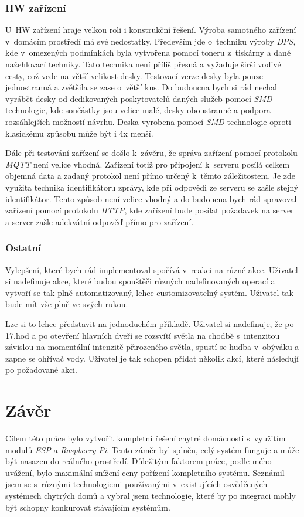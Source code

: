 \subsection*{HW zařízení}
\label{testovani:navrh:hw}
U~HW zařízení hraje velkou roli i konstrukční řešení.
Výroba samotného zařízení v~domácím prostředí má své nedostatky.
Především jde o~techniku výroby \emph{DPS}, kde v~omezených podmínkách byla vytvořena pomocí toneru z~tiskárny a dané nažehlovací techniky.
Tato technika není příliš přesná a vyžaduje širší vodivé cesty, což vede na větší velikost desky.
Testovací verze desky byla pouze jednostranná a zvětšila se zase o~větší kus.
Do budoucna bych si rád nechal vyrábět desky od dedikovaných poskytovatelů daných služeb pomocí \emph{SMD} technologie, kde součástky jsou velice malé, desky oboustranné a podpora rozsáhlejších možností návrhu.
Deska vyrobena pomocí \emph{SMD} technologie oproti klasickému způsobu může být i 4x menší.

Dále při testování zařízení se došlo k~závěru, že správa zařízení pomocí protokolu \emph{MQTT} není velice vhodná.
Zařízení totiž pro připojení k~serveru posílá celkem objemná data a zadaný protokol není přímo určený k~těmto záležitostem.
Je zde využita technika identifikátoru zprávy, kde při odpovědi ze serveru se zašle stejný identifikátor.
Tento způsob není velice vhodný a do budoucna bych rád spravoval zařízení pomocí protokolu \emph{HTTP}, kde zařízení bude posílat požadavek na server a server zašle adekvátní odpověď přímo pro zařízení.

\subsection*{Ostatní}
\label{testovani:navrh:ostatní}
Vylepšení, které bych rád implementoval spočívá v~reakci na různé akce.
Uživatel si nadefinuje akce, které budou spouštěči různých nadefinovaných operací a vytvoří se tak plně automatizovaný, lehce customizovatelný systém.
Uživatel tak bude mít vše plně ve svých rukou.

Lze si to lehce představit na jednoduchém příkladě.
Uživatel si nadefinuje, že po 17.hod a po otevření hlavních dveří se rozsvítí světla na chodbě s~intenzitou závislou na momentální intenzitě přirozeného světla, spustí se hudba v~obýváku a zapne se ohřívač vody.
Uživatel je tak schopen přidat několik akcí, které následují po požadované akci.

\chapter{Závěr}
\label{zaver}
Cílem této práce bylo vytvořit kompletní řešení chytré domácnosti s~využitím modulů \emph{ESP} a \emph{Raspberry Pi}.
Tento záměr byl splněn, celý systém funguje a může být nasazen do reálného prostředí.
Důležitým faktorem práce, podle mého uvážení, bylo maximální snížení ceny pořízení kompletního systému.
Seznámil jsem se s~různými technologiemi používanými v~existujících osvědčených systémech chytrých domů a vybral jsem technologie, které by po integraci mohly být schopny konkurovat stávajícím systémům.

